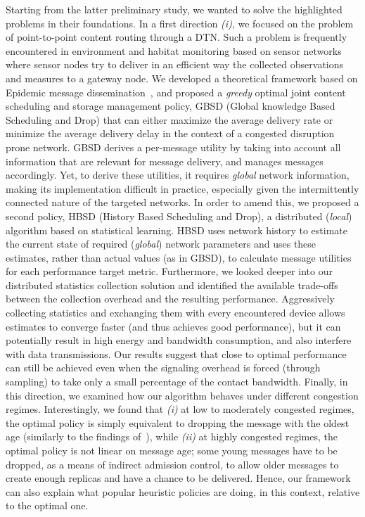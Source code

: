 Starting from the latter preliminary study, we wanted to solve the highlighted problems in their foundations. In a first direction \emph{(i)}, we focused on the problem of point-to-point content routing through a DTN. Such a problem is frequently encountered in environment and habitat monitoring based on sensor networks where sensor nodes try to deliver in an efficient way the collected observations and measures to a gateway node. We developed a theoretical framework based on Epidemic message dissemination~\cite{haas:mobihoc03,Inria:MessageDelay,akis:mobihoc06}, and proposed a \emph{greedy} optimal joint content scheduling and storage management policy, GBSD (Global knowledge Based Scheduling and Drop) that can either maximize the average delivery rate or minimize the average delivery delay in the context of a congested disruption prone network. GBSD derives a per-message utility by taking into account all information that are relevant for message delivery, and manages messages accordingly. Yet, to derive these utilities, it requires \textit{global} network information, making its implementation difficult in practice, especially given the intermittently connected nature of the targeted networks. In order to amend this, we proposed a second policy, HBSD (History Based Scheduling and Drop), a distributed (\textit{local}) algorithm based on statistical learning. HBSD uses network history to estimate the current state of required (\textit{global}) network parameters and uses these estimates, rather than actual values (as in GBSD), to calculate message utilities for each performance target metric. Furthermore, we looked deeper into our distributed statistics collection solution and identified the available trade-offs between the collection overhead and the resulting performance. Aggressively collecting statistics and exchanging them with every encountered device allows estimates to converge faster (and thus achieves good performance), but it can potentially result in high energy and bandwidth consumption, and also interfere with data transmissions. Our results suggest that close to optimal performance can still be achieved even when the signaling overhead is forced (through sampling) to take only a small percentage of the contact bandwidth. Finally, in this direction, we examined how our algorithm behaves under different congestion regimes. Interestingly, we found that \emph{(i)} at low to moderately congested regimes, the optimal policy is simply equivalent to dropping the message with the oldest age (similarly to the findings of~\cite{QueuingPolicies}), while \emph{(ii)} at highly congested regimes, the optimal policy is not linear on message age; some young messages have to be dropped, as a means of indirect admission control, to allow older messages to create enough replicas and have a chance to be delivered. Hence, our framework can also explain what popular heuristic policies are doing, in this context, relative to the optimal one.

